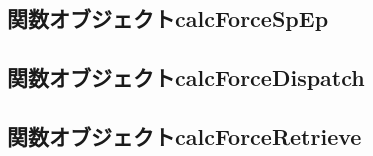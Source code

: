 

\subsection{関数オブジェクトcalcForceSpEp}
\label{sec:userdefined_calcForceSpEp}



\subsection{関数オブジェクトcalcForceDispatch}
\label{sec:userdefined_calcForceDispatch}



\subsection{関数オブジェクトcalcForceRetrieve}
\label{sec:userdefined_calcForceRetrieve}




%

